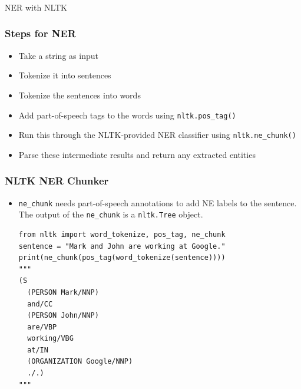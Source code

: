 \begin{frame}[fragile]\frametitle{}

\begin{center}
{\Large NER with NLTK}
\end{center}
\end{frame}

\begin{frame}[fragile]\frametitle{Steps for NER}
  \begin{itemize}
  \item Take a string as input
  \item Tokenize it into sentences
  \item Tokenize the sentences into words
  \item Add part-of-speech tags to the words using \lstinline|nltk.pos_tag()|
  \item  Run this through the NLTK-provided NER classifier using \lstinline|nltk.ne_chunk()|
  \item  Parse these intermediate results and return any extracted entities

  \end{itemize}
\end{frame}


\begin{frame}[fragile]\frametitle{NLTK NER Chunker}
  \begin{itemize}
  \item \lstinline|ne_chunk| needs part-of-speech annotations to add NE labels to the sentence. The output of the \lstinline|ne_chunk| is a \lstinline|nltk.Tree| object.
  \begin{lstlisting}
from nltk import word_tokenize, pos_tag, ne_chunk
sentence = "Mark and John are working at Google."
print(ne_chunk(pos_tag(word_tokenize(sentence))))
"""
(S
  (PERSON Mark/NNP)
  and/CC
  (PERSON John/NNP)
  are/VBP
  working/VBG
  at/IN
  (ORGANIZATION Google/NNP)
  ./.)
"""
  \end{lstlisting}
  \end{itemize}
\end{frame}



